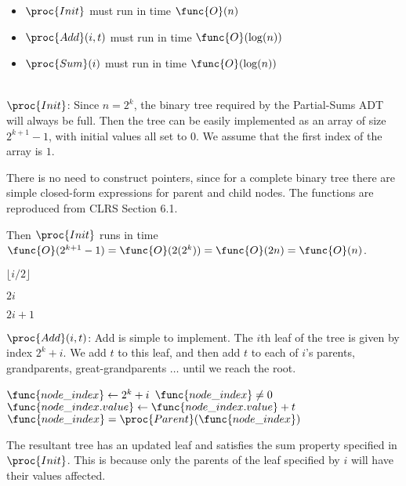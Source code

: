 \documentclass[11pt, answers]{exam}
\theoremstyle{plain}
\theoremstyle{definition}
\begin{document}
\begin{questions}
\begin{parts}
\begin{itemize}
\item $\proc{Init}$ must run in time $\func{O}(n)$
\item $\proc{Add}(i,t)$ must run in time $\func{O}(\log(n))$
\item $\proc{Sum}(i)$ must run in time $\func{O}(\log(n))$
\end{itemize}

\begin{solution}\\

$\proc{Init}$:
Since $n = 2^k$, the binary tree required by the Partial-Sums ADT will always be full. Then the tree can be easily implemented as an array of size $2^{k+1} - 1$, with initial values all set to $0$. We assume that the first index of the array is $1$.

There is no need to construct pointers, since for a complete binary tree there are simple closed-form expressions for parent and child nodes. The functions are reproduced from CLRS Section 6.1.

Then $\proc{Init}$ runs in time $\func{O}(2^{k+1} - 1) = \func{O}(2(2^k)) = \func{O}(2n) = \func{O}(n)$.

\begin{codebox}
\li 		\Return $\lfloor i/2 \rfloor$
\end{codebox}

\begin{codebox}
\li 		\Return $2i$
\end{codebox}

\begin{codebox}
\li 		\Return $2i + 1$
\end{codebox}

$\proc{Add}(i,t)$:
Add is simple to implement. The $i$th leaf of the tree is given by index $2^k + i$. We add $t$ to this leaf, and then add $t$ to each of $i$'s parents, grandparents, great-grandparents $\ldots$ until we reach the root.

\begin{codebox}
\li $\func{node\_index} \gets 2^k + i$
\li \While $\func{node\_index} \neq 0$
\li \Do $\func{node\_index.value} \gets \func{node\_index.value} + t$
\li $\func{node\_index} = \proc{Parent}(\func{node\_index})$
\End
\end{codebox}

The resultant tree has an updated leaf and satisfies the sum property specified in $\proc{Init}$. This is because only the parents of the leaf specified by $i$ will have their values affected.


\end{solution}
\end{parts}
\end{questions}
\end{document}
